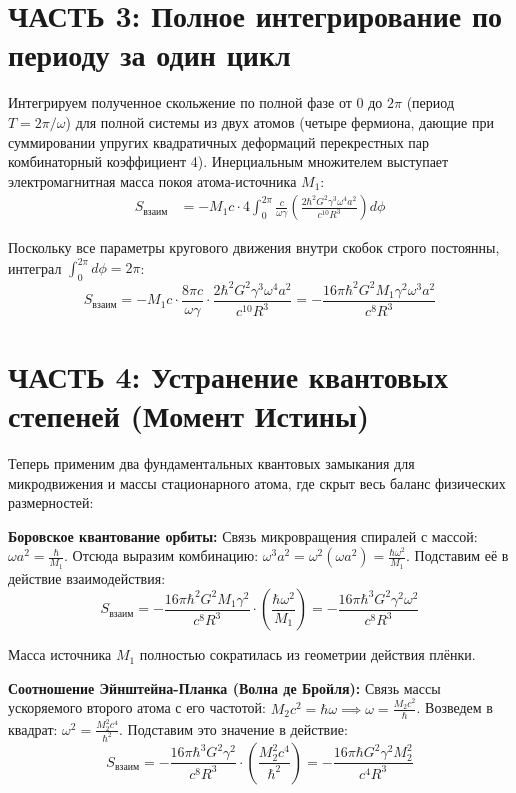 \documentclass[12pt,a4paper]{article}
\begin{document}
\section*{ЧАСТЬ 3: Полное интегрирование по периоду за один цикл}

Интегрируем полученное скольжение по полной фазе от $0$ до $2\pi$ (период $T = 2\pi/\omega$) для полной системы из двух атомов (четыре фермиона, дающие при суммировании упругих квадратичных деформаций перекрестных пар комбинаторный коэффициент 4). Инерциальным множителем выступает электромагнитная масса покоя атома-источника $M_1$:
\begin{align}
S_{взаим} &= - M_1 c \cdot 4 \int_0^{2\pi} \frac{c}{\omega \gamma} \left( \frac{2 \hbar^2 G^2 \gamma^3 \omega^4 a^2}{c^{10} R^3} \right) d\phi
\end{align}

Поскольку все параметры кругового движения внутри скобок строго постоянны, интеграл $\int_0^{2\pi} d\phi = 2\pi$:
\begin{equation}
S_{взаим} = - M_1 c \cdot \frac{8\pi c}{\omega \gamma} \cdot \frac{2 \hbar^2 G^2 \gamma^3 \omega^4 a^2}{c^{10} R^3} = - \frac{16\pi \hbar^2 G^2 M_1 \gamma^2 \omega^3 a^2}{c^8 R^3}
\end{equation}

\section*{ЧАСТЬ 4: Устранение квантовых степеней (Момент Истины)}

Теперь применим два фундаментальных квантовых замыкания для микродвижения и массы стационарного атома, где скрыт весь баланс физических размерностей:

\textbf{Боровское квантование орбиты:} Связь микровращения спиралей с массой: $\omega a^2 = \frac{\hbar}{M_1}$. Отсюда выразим комбинацию: $\omega^3 a^2 = \omega^2 (\omega a^2) = \frac{\hbar \omega^2}{M_1}$. Подставим её в действие взаимодействия:
\begin{equation}
S_{взаим} = - \frac{16\pi \hbar^2 G^2 M_1 \gamma^2}{c^8 R^3} \cdot \left( \frac{\hbar \omega^2}{M_1} \right) = - \frac{16\pi \hbar^3 G^2 \gamma^2 \omega^2}{c^8 R^3}
\end{equation}

Масса источника $M_1$ полностью сократилась из геометрии действия плёнки.

\textbf{Соотношение Эйнштейна-Планка (Волна де Бройля):} Связь массы ускоряемого второго атома с его частотой: $M_2 c^2 = \hbar \omega \implies \omega = \frac{M_2 c^2}{\hbar}$. Возведем в квадрат: $\omega^2 = \frac{M_2^2 c^4}{\hbar^2}$. Подставим это значение в действие:
\begin{equation}
S_{взаим} = - \frac{16\pi \hbar^3 G^2 \gamma^2}{c^8 R^3} \cdot \left( \frac{M_2^2 c^4}{\hbar^2} \right) = - \frac{16\pi \hbar G^2 \gamma^2 M_2^2}{c^4 R^3}
\end{equation}
\end{document}
